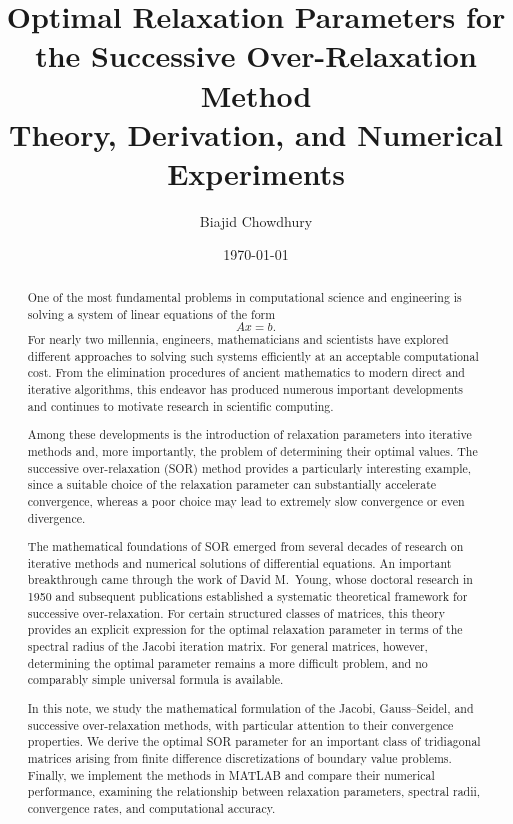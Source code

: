 \documentclass[11pt,a4paper]{article}
\title{
    \textbf{Optimal Relaxation Parameters for the
    Successive Over-Relaxation Method}\\[4pt]
    \large Theory, Derivation, and Numerical Experiments
}
\author{Biajid Chowdhury}
\date{\today}
\theoremstyle{definition}
\theoremstyle{remark}
\begin{document}
\maketitle

\begin{abstract}

One of the most fundamental problems in computational
science and engineering is solving a system of linear
equations of the form
\[
    Ax=b.
\]
For nearly two millennia, engineers, mathematicians and scientists
have explored different approaches to solving such
systems efficiently at an acceptable computational cost. From the elimination procedures
of ancient mathematics to modern direct and iterative
algorithms, this endeavor has produced numerous
important developments and continues to motivate
research in scientific computing.

Among these developments is the introduction of
relaxation parameters into iterative methods and,
more importantly, the problem of determining their
optimal values. The successive over-relaxation
(SOR) method provides a particularly interesting
example, since a suitable choice of the relaxation
parameter can substantially accelerate convergence,
whereas a poor choice may lead to extremely slow
convergence or even divergence.

The mathematical foundations of SOR emerged from
several decades of research on iterative methods
and numerical solutions of differential equations.
An important breakthrough came through the work
of David M.~Young, whose doctoral research in 1950
and subsequent publications established a systematic
theoretical framework for successive over-relaxation.
For certain structured classes of matrices, this
theory provides an explicit expression for the
optimal relaxation parameter in terms of the
spectral radius of the Jacobi iteration matrix.
For general matrices, however, determining the
optimal parameter remains a more difficult problem,
and no comparably simple universal formula is
available.

In this note, we study the mathematical formulation
of the Jacobi, Gauss--Seidel, and successive
over-relaxation methods, with particular attention
to their convergence properties. We derive the
optimal SOR parameter for an important class of
tridiagonal matrices arising from finite difference
discretizations of boundary value problems.
Finally, we implement the methods in MATLAB and
compare their numerical performance, examining
the relationship between relaxation parameters,
spectral radii, convergence rates, and computational
accuracy.


\end{abstract}
\end{document}
